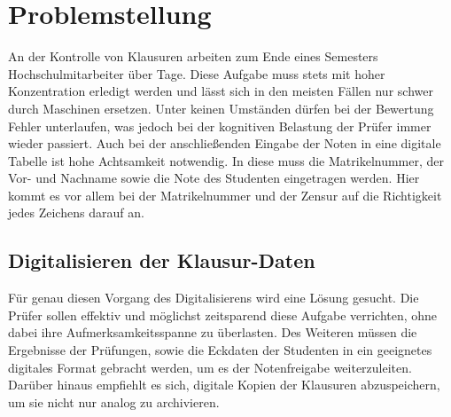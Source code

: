\documentclass[notables, nomenclature, oneside, 150]{HSMW-Thesis}
\begin{document}

\chapter{Problemstellung}\label{ch:problemstellung}

	An der Kontrolle von Klausuren arbeiten zum Ende eines Semesters Hochschulmitarbeiter über Tage. Diese Aufgabe muss stets mit hoher Konzentration erledigt werden und lässt sich in den meisten Fällen nur schwer durch Maschinen ersetzen. Unter keinen Umständen dürfen bei der Bewertung Fehler unterlaufen, was jedoch bei der kognitiven Belastung der Prüfer immer wieder passiert. Auch bei der anschließenden Eingabe der Noten in eine digitale Tabelle ist hohe Achtsamkeit notwendig. In diese muss die Matrikelnummer, der Vor- und Nachname sowie die Note des Studenten eingetragen werden. Hier kommt es vor allem bei der Matrikelnummer und der Zensur auf die Richtigkeit jedes Zeichens darauf an. 
	
	\section{Digitalisieren der Klausur-Daten}
	Für genau diesen Vorgang des Digitalisierens wird eine Lösung gesucht. Die Prüfer sollen effektiv und möglichst zeitsparend diese Aufgabe verrichten, ohne dabei ihre Aufmerksamkeitsspanne zu überlasten. Des Weiteren müssen die Ergebnisse der Prüfungen, sowie die Eckdaten der Studenten in ein geeignetes digitales Format gebracht werden, um es der Notenfreigabe weiterzuleiten. Darüber hinaus empfiehlt es sich, digitale Kopien der Klausuren abzuspeichern, um sie nicht nur analog zu archivieren.
	
\end{document}
